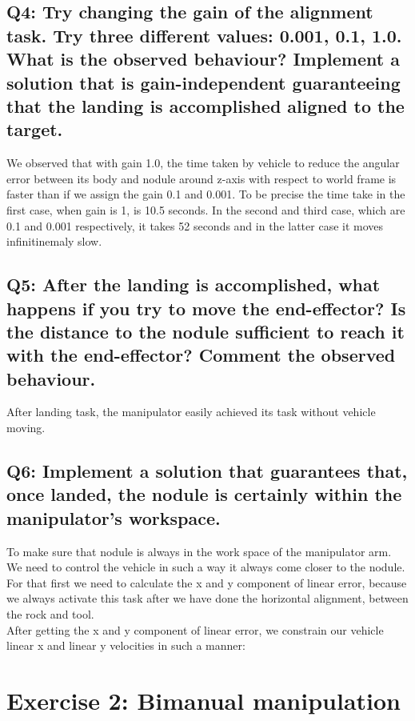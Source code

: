\documentclass{article}
\begin{document}
\subsection{Q4: Try changing the gain of the alignment task. Try three different values: 0.001, 0.1, 1.0. What is the observed behaviour? Implement a solution that is gain-independent guaranteeing that the landing is accomplished aligned to the target.}
We observed that with gain 1.0, the time taken by vehicle to reduce the angular error between its body and nodule around z-axis with respect to world frame is faster than if we assign the gain 0.1 and 0.001. To be precise the time take in the first case, when gain is 1, is 10.5 seconds. In the second and third case, which are 0.1 and 0.001 respectively, it takes 52 seconds and in the latter case it moves infinitinemaly slow. 

\subsection{Q5: After the landing is accomplished, what happens if you try to move the end-effector? Is the distance to the nodule sufficient to reach it with the end-effector? Comment the observed behaviour.}
After landing task, the manipulator easily achieved its task without vehicle moving. 

\subsection{Q6: Implement a solution that guarantees that, once landed, the nodule is certainly within the manipulator's workspace.}
To make sure that nodule is always in the work space of the manipulator arm. We need to control the vehicle in such a way it always come closer to the nodule.
For that first we need to calculate the x and y component of linear error, because we always activate this task after we have done the horizontal alignment, between the rock and tool. \\
After getting the x and y component of linear error, we constrain our vehicle linear x and linear y velocities in such a manner:

\clearpage
\section{Exercise 2: Bimanual manipulation}
\end{document}
